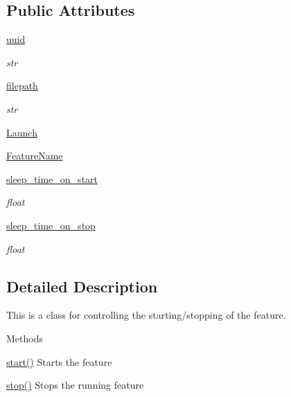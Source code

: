 \subsection*{Public Attributes}
\begin{DoxyCompactItemize}
\item 
\hyperlink{classFeatureControl_1_1FeatureControl_af8533a40b9c881dd05254039a47c327a}{uuid}
\begin{DoxyCompactList}\small\item\em str \end{DoxyCompactList}\item 
\hyperlink{classFeatureControl_1_1FeatureControl_a109435a4846e1d31370f92e12a9cb645}{filepath}
\begin{DoxyCompactList}\small\item\em str \end{DoxyCompactList}\item 
\hyperlink{classFeatureControl_1_1FeatureControl_a13a501b445ea0db6d7ed24b09ab94402}{Launch}
\item 
\hyperlink{classFeatureControl_1_1FeatureControl_a95e3fe171ba7d3d44f3d237c204ebb0e}{Feature\+Name}
\item 
\hyperlink{classFeatureControl_1_1FeatureControl_a5911b30613b10be90a2ab8519bdc5bb2}{sleep\+\_\+time\+\_\+on\+\_\+start}
\begin{DoxyCompactList}\small\item\em float \end{DoxyCompactList}\item 
\hyperlink{classFeatureControl_1_1FeatureControl_aa577601585488e8fed13f9a1ad36d7b3}{sleep\+\_\+time\+\_\+on\+\_\+stop}
\begin{DoxyCompactList}\small\item\em float \end{DoxyCompactList}\end{DoxyCompactItemize}


\subsection{Detailed Description}
This is a class for controlling the starting/stopping of the feature. 

\begin{DoxyParagraph}{Methods}

\end{DoxyParagraph}
\begin{DoxyParagraph}{}
\hyperlink{classFeatureControl_1_1FeatureControl_a21f4c45cce80b2be3a1110d44e12fbfc}{start()} Starts the feature 
\end{DoxyParagraph}
\begin{DoxyParagraph}{}
\hyperlink{classFeatureControl_1_1FeatureControl_a1dc5cd2f9a7fe0aa97c77a4f5f6d1c86}{stop()} Stops the running feature 
\end{DoxyParagraph}


